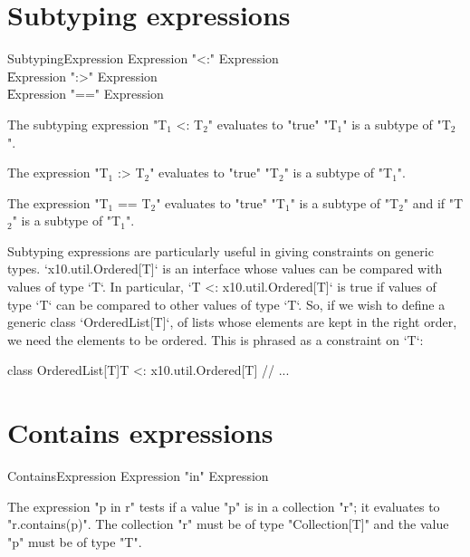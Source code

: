 \section{Subtyping expressions}

\begin{grammar}
SubtypingExpression \: Expression \xcd"<:" Expression \\
                    \| Expression \xcd":>" Expression \\
                    \| Expression \xcd"==" Expression \\
\end{grammar}

The subtyping expression \xcdmath"T$_1$ <: T$_2$" evaluates to \xcd"true"
\xcdmath"T$_1$" is a subtype of \xcdmath"T$_2$".

The expression \xcdmath"T$_1$ :> T$_2$" evaluates to \xcd"true"
\xcdmath"T$_2$" is a subtype of \xcdmath"T$_1$".

The expression \xcdmath"T$_1$ == T$_2$"
evaluates to  \xcd"true" \xcdmath"T$_1$" is a subtype of \xcdmath"T$_2$" and
if \xcdmath"T$_2$" is a subtype of \xcdmath"T$_1$".

Subtyping expressions are particularly useful in giving constraints on generic
types.  \xcd`x10.util.Ordered[T]` is an interface whose values can be compared
with values of type \xcd`T`. 
In particular, \xcd`T <: x10.util.Ordered[T]` is
true if values of type \xcd`T` can be compared to other values of type
\xcd`T`.  So, if we wish to define a generic class \xcd`OrderedList[T]`, of
lists whose elements are kept in the right order, we need the elements to be
ordered.  This is phrased as a constraint on \xcd`T`: 
\begin{xten}
class OrderedList[T]{T <: x10.util.Ordered[T]} {
  // ...
}
\end{xten}
%




\section{Contains expressions}

\begin{grammar}
ContainsExpression \: Expression \xcd"in" Expression \\
\end{grammar}

The expression \xcd"p in r" tests if a value \xcd"p" is in a collection
\xcd"r"; it evaluates to \xcd"r.contains(p)".
The collection \xcd"r"
must be of type \xcd"Collection[T]" and the value \xcd"p" must
be of type \xcd"T".


